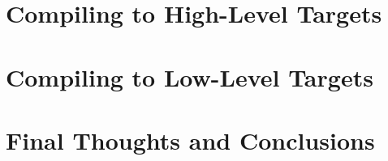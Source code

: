 \chapter{Compiling to High-Level Targets}
\label{chap:high_level_targets}



\chapter{Compiling to Low-Level Targets}
\label{chap:low_level_targets}




\chapter{Final Thoughts and Conclusions}
\label{chap:final_thoughts}

%

\listoffigures
\listoftables
{}
\nocite{*}
\printbibliography[heading=bibintoc]

